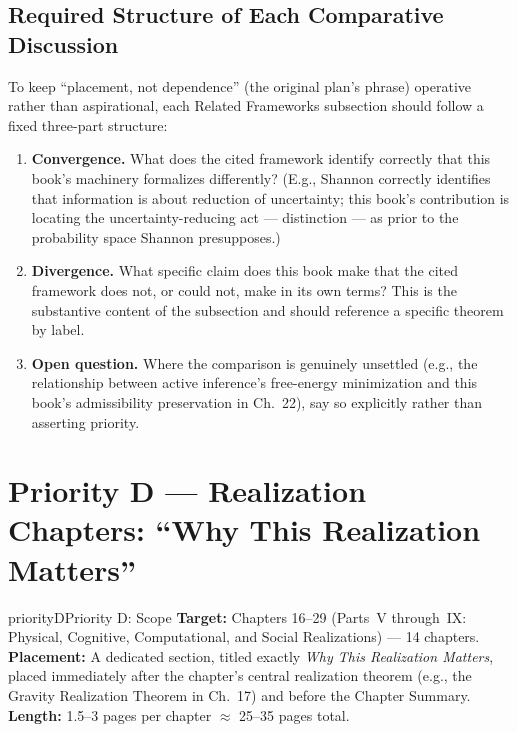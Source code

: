 \documentclass[11pt]{report}
\begin{document}
\section{Required Structure of Each Comparative Discussion}

To keep ``placement, not dependence'' (the original plan's
phrase) operative rather than aspirational, each Related
Frameworks subsection should follow a fixed three-part
structure:

\begin{enumerate}
\item \textbf{Convergence.} What does the cited framework
  identify correctly that this book's machinery formalizes
  differently? (E.g., Shannon correctly identifies that
  information is about reduction of uncertainty; this book's
  contribution is locating the uncertainty-reducing act
  --- distinction --- as prior to the probability space Shannon
  presupposes.)
\item \textbf{Divergence.} What specific claim does this book
  make that the cited framework does not, or could not, make in
  its own terms? This is the substantive content of the
  subsection and should reference a specific theorem by label.
\item \textbf{Open question.} Where the comparison is genuinely
  unsettled (e.g., the relationship between active inference's
  free-energy minimization and this book's admissibility
  preservation in Ch.~22), say so explicitly rather than
  asserting priority.
\end{enumerate}

\chapter{Priority D --- Realization Chapters: ``Why This Realization Matters''}
\label{ch:priority-d}

\begin{prioritybox}{priorityD}{Priority D: Scope}
\textbf{Target:} Chapters 16--29 (Parts~V through~IX: Physical,
  Cognitive, Computational, and Social Realizations) --- 14
  chapters.\\
\textbf{Placement:} A dedicated section, titled exactly
  \textit{Why This Realization Matters}, placed immediately
  after the chapter's central realization theorem (e.g., the
  Gravity Realization Theorem in Ch.~17) and before the Chapter
  Summary.\\
\textbf{Length:} 1.5--3 pages per chapter $\approx$
  25--35 pages total.
\end{prioritybox}
\end{document}
